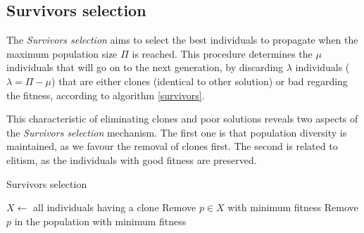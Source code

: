 \subsection{Survivors selection}
\label{subsec:survivors}
The \textit{Survivors selection} aims to select the best individuals to propagate when the maximum population size $\Pi$ is reached. This procedure determines the $\mu$ individuals that will go on to the next generation, by discarding $\lambda$ individuals ($\lambda = \Pi - \mu$) that are either clones (identical to other solution) or bad regarding the fitness, according to algorithm \ref{survivors}.

This characteristic of eliminating clones and poor solutions reveals two aspects of the \textit{Survivors selection} mechanism. The first one is that population diversity is maintained, as we favour the removal of clones first. The second is related to elitism, as the individuals with good fitness are preserved. %

\begin{algorithm}[H]
\caption{Survivors selection}
\label{survivors}
\begin{algorithmic}[1]
\STATE $X \leftarrow $ all individuals having a clone
\STATE Remove $p \in X$ with minimum fitness
\ELSE
\STATE Remove $p$ in the population with minimum fitness
\ENDIF
\ENDFOR
\end{algorithmic}
\end{algorithm}


